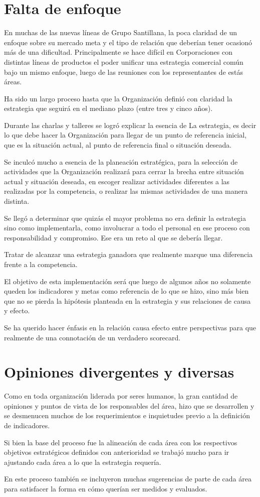 \section{Falta de enfoque}
\item {En muchas de las nuevas líneas de Grupo Santillana, la poca claridad de un enfoque sobre su mercado meta y el tipo de relación que deberían tener ocasionó más de una dificultad. Principalmente se hace difícil en Corporaciones con distintas líneas de productos el poder unificar una estrategia comercial común bajo un mismo enfoque, luego de las reuniones con los representantes de estás áreas.

Ha sido un largo proceso hasta que la Organización definió con claridad la estrategia que seguirá en el mediano plazo (entre tres y cinco años).

Durante las charlas y talleres se logró explicar la esencia de La estrategia,  es decir lo que debe hacer la Organización para llegar de un punto de referencia inicial, que es la situación actual, al punto de referencia final o situación deseada.

Se inculcó mucho a esencia de la planeación estratégica, para la selección de actividades que la Organización realizará para cerrar la brecha entre situación actual y situación deseada, en escoger realizar actividades diferentes a las realizadas por la competencia, o realizar las mismas actividades de una manera distinta.

Se llegó a determinar que quizás el mayor problema no era definir la estrategia sino como implementarla, como involucrar a todo el personal en ese proceso con responsabilidad y compromiso. Ese era un reto al que se debería llegar.

Tratar de alcanzar una estrategia ganadora que realmente marque una diferencia frente a la competencia.

El objetivo de esta implementación será que luego de algunos años no solamente queden los indicadores y metas como referencia de lo que se hizo, sino más bien que no se pierda la hipótesis planteada en la estrategia y sus relaciones de causa y efecto.

Se ha querido hacer énfasis en la relación causa efecto entre perspectivas para que realmente de una connotación de un verdadero scorecard.}

\section{Opiniones divergentes y diversas}
\item {Como en toda organización liderada por seres humanos, la gran cantidad de opiniones y puntos de vista de los responsables del área, hizo que se desarrollen y se desmenucen muchos de los requerimientos e inquietudes previo a la definición de indicadores.

Si bien la base del proceso fue la alineación de cada área con los respectivos objetivos estratégicos definidos con anterioridad se trabajó mucho para ir ajustando cada área a lo que la estrategia requería.

En este proceso también se incluyeron muchas sugerencias de parte de cada área para satisfacer la forma en cómo querían ser medidos y evaluados.}



